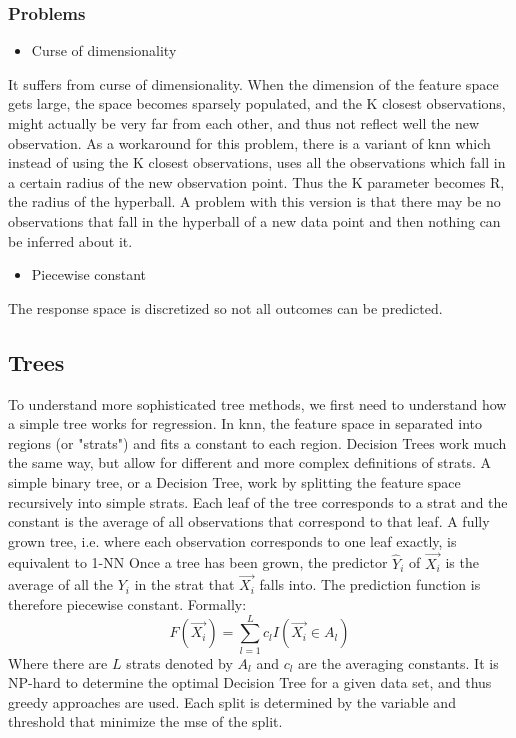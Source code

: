 \subsubsection{Problems}
\begin{itemize}
\item Curse of dimensionality 
\end{itemize}
It suffers from curse of dimensionality. When the dimension of the feature space gets large, the space becomes sparsely populated, and the K closest observations, might actually be very far from each other, and thus not reflect well the new observation.
As a workaround for this problem, there is a variant of \acrshort{knn} which instead of using the K closest observations, uses all the observations which fall in a certain radius of the new observation point. Thus the K parameter becomes R, the radius of the hyperball. A problem with this version is that there may be no observations that fall in the hyperball of a new data point and then nothing can be inferred about it.
\begin{itemize}
\item Piecewise constant
\end{itemize}
The response space is discretized so not all outcomes can be predicted.

\subsection{Trees}
To understand more sophisticated tree methods, we first need to understand how a simple tree works for regression. In \acrshort{knn}, the feature space in separated into regions (or "strats") and fits a constant to each region. Decision Trees work much the same way, but allow for  different and more complex definitions of strats.
A simple binary tree, or a Decision Tree, work by splitting the feature space recursively into simple strats. Each leaf of the tree corresponds to a strat and the constant is the average of all observations that correspond to that leaf. A fully grown tree, i.e. where each observation corresponds to one leaf exactly, is equivalent to 1-NN
 Once a tree has been grown, the predictor $\hat{Y}_i$ of $\vec{X_i}$ is the average of all the $Y_i$ in the strat that $\vec{X_i}$ falls into. The prediction function is therefore piecewise constant.
Formally:
$$
F(\vec{X_i}) = \sum_{l=1}^L c_l I(\vec{X_i} \in A_l)
$$
Where there are $L$ strats denoted by $A_l$ and $c_l$ are the averaging constants.
It is NP-hard to determine the optimal Decision Tree for a given data set, and thus greedy approaches are used. Each split is determined by the variable and threshold that minimize the \acrlong{mse} of the split.


